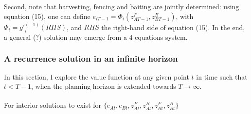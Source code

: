 \documentclass{article}
\begin{document}
Second, note that harvesting, fencing and baiting are jointly determined: using equation (15), one can define $e_{iT-1}=\Phi_i(z_{AT-1}^F, z_{BT-1}^B)$, with $\Phi_i = g'^{(-1)}_i(RHS)$, and $RHS$ the right-hand side of equation (15). In the end, a general (?) solution may emerge from a 4 equations system. \\
\subsubsection{A recurrence solution in an infinite horizon}
In this section, I explore the value function at any given point $t$ in time such that $t<T-1$, when the planning horizon is extended towards $T \to \infty$.
\\\\
For interior solutions to exist for $\{e_{At}, e_{Bt}, z_{At}^F, z_{At}^B, z_{Bt}^F, z_{Bt}^B\}$

\newpage

\end{document}
